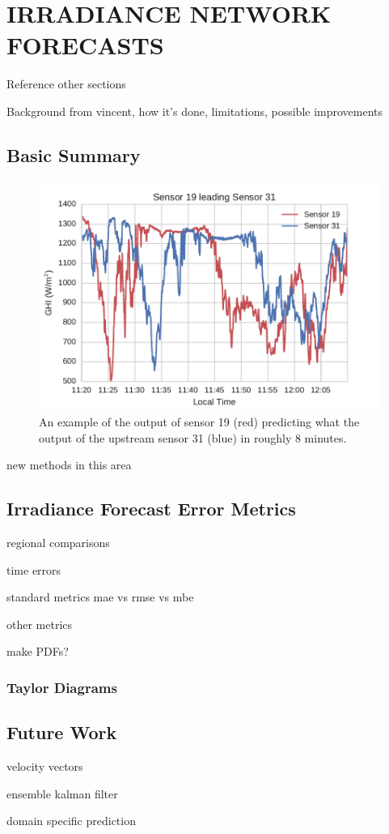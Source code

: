 \chapter{IRRADIANCE NETWORK FORECASTS}
\label{chap:network}

Reference other sections


Background from vincent, how it's done, limitations, possible
improvements

\section{Basic Summary}
\begin{figure}[h]
\includegraphics[width=\textwidth]{figs/leading_sens.pdf}
\caption[Example of data from one sensor predicting the output of
another]{An example of the output of sensor 19 (red) predicting what
  the output of the upstream sensor 31 (blue) in roughly 8
  minutes.}
\label{fig:leading_sens}
\end{figure}


new methods in this area

\section{Irradiance Forecast Error Metrics}
regional comparisons

time errors

standard metrics
mae vs rmse vs mbe

other metrics

make PDFs?


\subsection{Taylor Diagrams}


\section{Future Work}
velocity vectors

ensemble kalman filter

domain specific prediction

